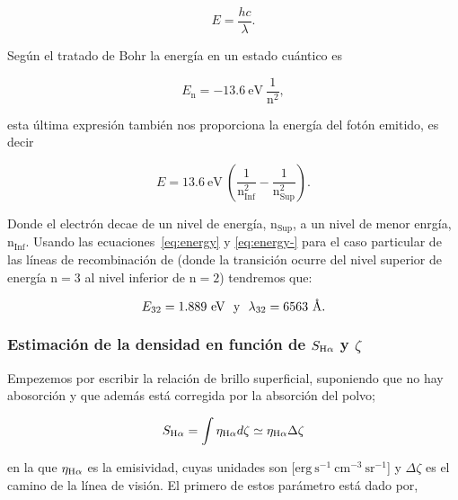 \begin{equation}
  \label{eq:energy}
  E = \frac{hc}{\lambda}. 
\end{equation}
 
Según el tratado de Bohr la energía en un estado cuántico es

\begin{equation}
  \label{eq:quantum}
  E_{\text{n}} = -13.6~\text{eV}~\frac{1}{\text{n}^{2}},
\end{equation}

esta última expresión también nos proporciona la energía del fotón emitido, es decir

\begin{equation}
  \label{eq:energy-}
 E = 13.6~\text{eV}~\left(\frac{1}{\text{n}_{\text{Inf}}^{2}}-\frac{1}{\text{n}_{\text{Sup}}^{2}}\right).
\end{equation}

 Donde el electrón decae de un nivel de energía, \(\text{n}_{\text{Sup}}\), a un nivel de menor enrgía, \(\text{n}_{\text{Inf}}\). Usando las ecuaciones~\ref{eq:energy} y \ref{eq:energy-} para el caso particular de las líneas de recombinación de \ha{} (donde la transición ocurre del nivel superior de energía \(\text{n}=3\) al nivel inferior de \(\text{n}=2\)) tendremos que: 

\begin{equation}
 \label{eq:values-energy-landa}
  E_{32} = 1.889~\text{eV}  ~~ \text{y} ~~
  \lambda_{32} = 6563~\text{\AA{}}{}.
 \end{equation}

\subsubsection{Estimación de la densidad en función de \(S_{\mathrm{H}\alpha{}}\) y \(\zeta\) }
\label{sec:brillo}

Empezemos por escribir la relación de brillo superficial, suponiendo que no hay abosorción y que además está corregida por la absorción del polvo;

\begin{equation}
  \label{eq:brillo}
  S_{\mathrm{H}\alpha{}} = \int \eta_{\mathrm{H}\alpha{}} d\zeta \simeq \eta_{\mathrm{H}\alpha{}} \Delta \zeta
\end{equation}  

\noindent en la que  \(\eta_{\mathrm{H}\alpha{}}\) es la emisividad, cuyas unidades son [\(\mathrm{erg~s^{-1}~cm^{-3}~sr^{-1}}\)] y \(\Delta \zeta\) es el camino de la línea de visión. El primero de estos parámetro está dado por,

